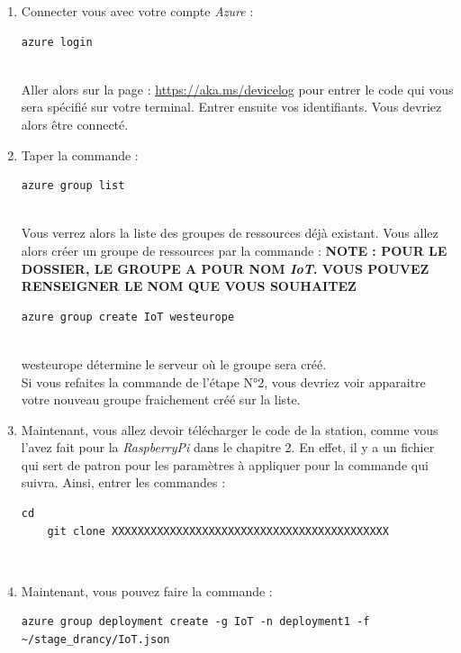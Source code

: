\begin{enumerate}
	\item Connecter vous avec votre compte \textit{Azure} :
	\begin{lstlisting}[style=MyBashStyle]
	azure login
	\end{lstlisting}\\
	Aller alors sur la page : \href{https://aka.ms/devicelog}{https://aka.ms/devicelog} pour entrer le code qui vous sera spécifié sur votre terminal. Entrer ensuite vos identifiants. Vous devriez alors être connecté. %
	\item Taper la commande :
	\begin{lstlisting}[style=MyBashStyle]
	azure group list
	\end{lstlisting}\\
Vous verrez alors la liste des groupes de ressources déjà existant. Vous allez alors créer un groupe de ressources par la commande : 
	\textbf{NOTE : POUR LE DOSSIER, LE GROUPE A POUR NOM \textit{IoT}. VOUS POUVEZ RENSEIGNER LE NOM QUE VOUS SOUHAITEZ}\\
	\begin{lstlisting}[style=MyBashStyle]
	azure group create IoT westeurope
	\end{lstlisting}\\
westeurope détermine le serveur où le groupe sera créé. %
\\
Si vous refaites la commande de l'étape N°2, vous devriez voir apparaitre votre nouveau groupe fraichement créé sur la liste.
	\item Maintenant, vous allez devoir télécharger le code de la station, comme vous l'avez fait pour la \textit{RaspberryPi} dans le chapitre 2. En effet, il y a un fichier qui sert de patron pour les paramètres à appliquer pour la commande qui suivra. Ainsi, entrer les commandes : 
	\begin{lstlisting}[style=MyBashStyle]
	cd
	git clone XXXXXXXXXXXXXXXXXXXXXXXXXXXXXXXXXXXXXXXXXXX
	\end{lstlisting}\\
	\item Maintenant, vous pouvez faire la commande :
	\begin{lstlisting}[style=MyBashStyle]
azure group deployment create -g IoT -n deployment1 -f ~/stage_drancy/IoT.json
	\end{lstlisting}\\ %


\end{enumerate}
